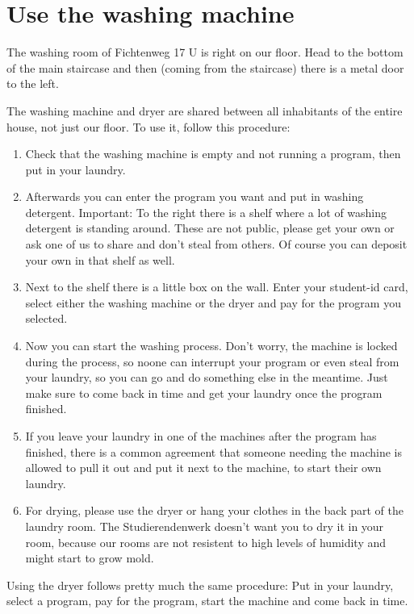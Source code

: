 \section{Use the washing machine}
The washing room of Fichtenweg 17 U is right on our floor. Head to the bottom of the main staircase and then (coming from the staircase) there is a metal door to the left.

The washing machine and dryer are shared between all inhabitants of the entire house, not just our floor. To use it, follow this procedure:
\begin{enumerate}
    \item Check that the washing machine is empty and not running a program, then put in your laundry.
    \item Afterwards you can enter the program you want and put in washing detergent. Important: To the right there is a shelf where a lot of washing detergent is standing around. These are not public, please get your own or ask one of us to share and don't steal from others. Of course you can deposit your own in that shelf as well.
    \item Next to the shelf there is a little box on the wall. Enter your student-id card, select either the washing machine or the dryer and pay for the program you selected.
    \item Now you can start the washing process. Don't worry, the machine is locked during the process, so noone can interrupt your program or even steal from your laundry, so you can go and do something else in the meantime. Just make sure to come back in time and get your laundry once the program finished.
    \item If you leave your laundry in one of the machines after the program has finished, there is a common agreement that someone needing the machine is allowed to pull it out and put it next to the machine, to start their own laundry.
    \item For drying, please use the dryer or hang your clothes in the back part of the laundry room. The Studierendenwerk doesn't want you to dry it in your room, because our rooms are not resistent to high levels of humidity and might start to grow mold.
\end{enumerate}

Using the dryer follows pretty much the same procedure: Put in your laundry, select a program, pay for the program, start the machine and come back in time.


